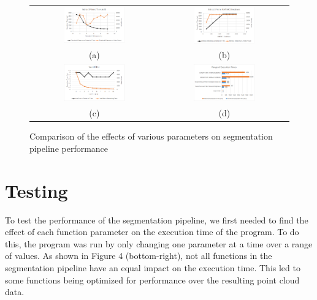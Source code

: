 \documentclass[journal]{IEEEtran}
\begin{document}
\begin{figure}
\begin{tabular}{cc}
  \includegraphics[width=0.5\textwidth]{images/image00} &   \includegraphics[width=0.5\textwidth]{images/image09} \\
(a) & (b) \\[6pt]
\includegraphics[width=0.5\textwidth]{images/image08} & 
 \includegraphics[width=0.5\textwidth]{images/image05} \\
(c) & (d) \\[6pt]


\end{tabular}
\caption{Comparison of the effects of various parameters on segmentation pipeline performance}
\end{figure}

\section{Testing}
To test the performance of the segmentation pipeline, we first needed to find the effect of each function parameter on the execution time of the program.  To do this, the program was run by only changing one parameter at a time over a range of values.  As shown in Figure 4 (bottom-right), not all functions in the segmentation pipeline have an equal impact on the execution time.  This led to some functions being optimized for performance over the resulting point cloud data.
\end{document}
